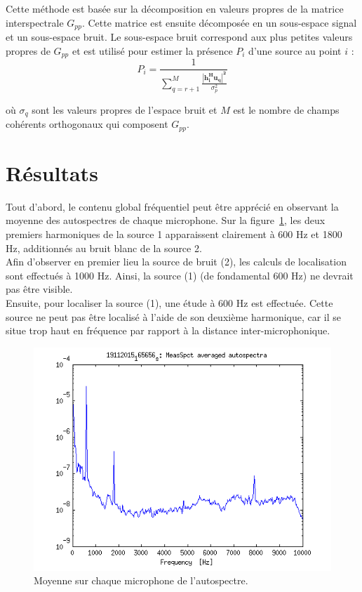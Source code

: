 \documentclass[a4paper]{article}
\renewcommand{\b}[1]{\boldsymbol{#1}}
\begin{document}
Cette méthode est basée sur la décomposition en valeurs propres de la matrice interspectrale $G_{pp}$. Cette matrice est ensuite décomposée en un sous-espace signal et un sous-espace bruit. Le sous-espace bruit correspond aux plus petites valeurs propres de $G_{pp}$ et est utilisé pour estimer la présence $P_i$ d'une source au point $i$ :
 \begin{equation}
 P_i = \frac{1}{\sum \limits_{q=r+1}^{M} \frac{\b{\left|h_{i}^{H}u_q\right|^{2}}}{\sigma_{p}^{2}}}
\end{equation}

où $\sigma_q$ sont les valeurs propres de l'espace bruit et $M$ est le nombre de champs cohérents orthogonaux qui composent $G_{pp}$.


\section{Résultats}

Tout d'abord, le contenu global fréquentiel peut être apprécié en observant la moyenne des autospectres de chaque microphone. Sur la figure~\ref{auto}, les deux premiers harmoniques de la source 1 apparaissent clairement à 600 Hz et 1800 Hz, additionnés au bruit blanc de la source 2. \\


Afin d'observer en premier lieu la source de bruit (2), les calculs de localisation sont effectués à 1000 Hz. Ainsi, la source (1) (de fondamental 600 Hz) ne devrait pas être visible.\\

Ensuite, pour localiser la source (1), une étude à 600 Hz est effectuée. Cette source ne peut pas être localisé à l'aide de son deuxième harmonique, car il se situe trop haut en fréquence par rapport à la distance inter-microphonique.\\



\begin{figure}[!h]
	\centering
	\includegraphics[scale=0.5]{autospectre_16h.png}
	\caption{Moyenne sur chaque microphone de l'autospectre.\label{auto}}
\end{figure}
\end{document}
